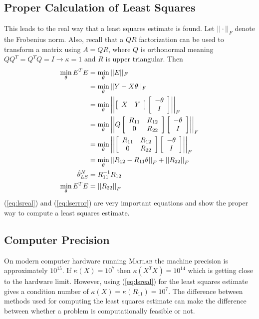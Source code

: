 \subsection{Proper Calculation of Least Squares}
This leads to the real way that a least squares estimate is found.
Let $||\cdot||_F$ denote the Frobenius norm.
Also, recall that a $QR$ factorization can be used to transform a matrix using $A=QR$, where $Q$ is orthonormal meaning $QQ^T=Q^T Q=I\rightarrow\kappa=1$ and $R$ is upper triangular.
Then
\begin{align}
\min_\theta E^T E &= \min_\theta||E||_F \nonumber \\
&= \min_\theta||Y-X\theta||_F \nonumber \\
&= \min_\theta\left|\left|\left[\begin{array}{c c} X & Y \end{array}\right] \left[\begin{array}{c} -\theta \\ I \end{array}\right]\right|\right|_F \nonumber \\
&= \min_\theta\left|\left|Q\left[\begin{array}{c c} R_{11} & R_{12} \\ 0 & R_{22} \end{array}\right] \left[\begin{array}{c} -\theta \\ I \end{array}\right]\right|\right|_F \nonumber \\
&= \min_\theta\left|\left|\left[\begin{array}{c c} R_{11} & R_{12} \\ 0 & R_{22} \end{array}\right] \left[\begin{array}{c} -\theta \\ I \end{array}\right]\right|\right|_F \nonumber \\
&= \min_\theta\left|\left|R_{12}-R_{11}\theta\right|\right|_F + \left|\left|R_{22}\right|\right|_F \nonumber \\
\label{eq:lsreal}
\hat{\theta}_{LS}^N &= R_{11}^{-1}R_{12} \\
\label{eq:lserror}
\min_\theta E^T E &= \left|\left|R_{22}\right|\right|_F
\end{align}
(\ref{eq:lsreal}) and (\ref{eq:lserror}) are very important equations and show the proper way to compute a least squares estimate.

\subsection{Computer Precision}
On modern computer hardware running \textsc{Matlab} the machine precision is approximately $10^{15}$.
If $\kappa(X)=10^7$ then $\kappa(X^T X)=10^{14}$ which is getting close to the hardware limit.
However, using (\ref{eq:lsreal}) for the least squares estimate gives a condition number of $\kappa(X)=\kappa(R_{11})=10^7$.
The difference between methods used for computing the least squares estimate can make the difference between whether a problem is computationally feasible or not.
